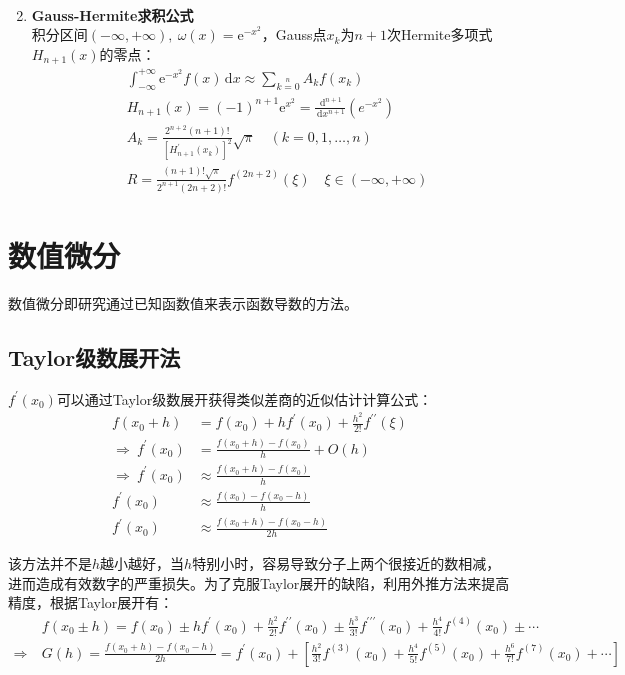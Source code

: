 \begin{enumerate}
\begin{align*}
        \end{align*}
    \item \textbf{Gauss-Hermite求积公式}\\
        积分区间$(-\infty, +\infty),\ \omega(x)=\mathrm{e}^{-x^2}$，Gauss点$x_k$为$n+1$次Hermite多项式$H_{n+1}(x)$的零点：
        \begin{align*}
            & \int_{-\infty}^{+\infty} \mathrm{e}^{-x^2}f(x)\,\mathrm{d}x \approx \sum\limits_{k=0}\limits^{n}A_k f(x_k) \\[3mm]
            & H_{n+1}(x) = (-1)^{n+1}\mathrm{e}^{x^2}=\frac{\,\mathrm{d}^{n+1}}{\,\mathrm{d}x^{n+1}}(e^{-x^2}) \\[3mm]
            & A_k = \frac{2^{n+2} (n+1)!}{[H_{n+1}^{\prime}(x_k)]^2}\sqrt{\pi} \quad (k=0,1,\dots,n) \\[3mm]
            & R = \frac{(n+1)!\sqrt{\pi}}{2^{n+1}(2n+2)!}f^{(2n+2)}(\xi) \quad \xi \in (-\infty,+\infty)
        \end{align*}
\end{enumerate}


\newpage
\section{数值微分}
数值微分即研究通过已知函数值来表示函数导数的方法。

\subsection{Taylor级数展开法}
$f^{\prime}(x_0)$可以通过Taylor级数展开获得类似差商的近似估计计算公式：
\begin{align*}
    f(x_0+h) &= f(x_0) + hf^{\prime}(x_0) + \frac{h^2}{2!}f^{\prime \prime}(\xi) \\[3mm]
    \Rightarrow \  f^{\prime}(x_0) &= \frac{f(x_0+h) - f(x_0)}{h} + O(h) \\[3mm]
    \Rightarrow \  f^{\prime}(x_0) &\approx \frac{f(x_0+h) - f(x_0)}{h} \\[3mm]
    f^{\prime}(x_0) &\approx \frac{f(x_0) - f(x_0-h)}{h} \\[3mm]
    f^{\prime}(x_0) &\approx \frac{f(x_0+h) - f(x_0-h)}{2h}
\end{align*}

该方法并不是$h$越小越好，当$h$特别小时，容易导致分子上两个很接近的数相减，进而造成有效数字的严重损失。为了克服Taylor展开的缺陷，利用外推方法来提高精度，根据Taylor展开有：
\begin{align*}
    & f(x_0 \pm h) = f(x_0) \pm hf^{\prime}(x_0) + \frac{h^2}{2!}f^{\prime \prime}(x_0) \pm \frac{h^3}{3!}f^{\prime \prime \prime}(x_0) + \frac{h^4}{4!}f^{(4)}(x_0) \pm \cdots \\[4mm]
    \Rightarrow \ & G(h) = \frac{f(x_0+h)-f(x_0-h)}{2h} = f^{\prime}(x_0) + [\frac{h^2}{3!}f^{(3)}(x_0) + \frac{h^4}{5!}f^{(5)}(x_0) + \frac{h^6}{7!}f^{(7)}(x_0) + \cdots]
\end{align*}

